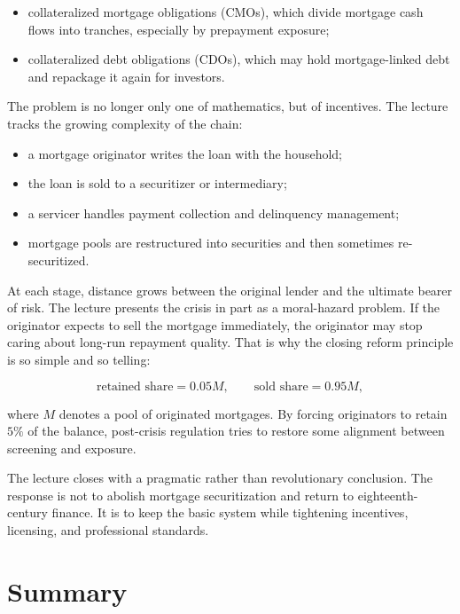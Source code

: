\begin{itemize}
\item collateralized mortgage obligations (CMOs), which divide mortgage cash flows into tranches, especially by prepayment exposure;
\item collateralized debt obligations (CDOs), which may hold mortgage-linked debt and repackage it again for investors.
\end{itemize}

The problem is no longer only one of mathematics, but of incentives. The lecture tracks the growing complexity of the chain:

\begin{itemize}
\item a mortgage originator writes the loan with the household;
\item the loan is sold to a securitizer or intermediary;
\item a servicer handles payment collection and delinquency management;
\item mortgage pools are restructured into securities and then sometimes re-securitized.
\end{itemize}

At each stage, distance grows between the original lender and the ultimate bearer of risk. The lecture presents the crisis in part as a moral-hazard problem. If the originator expects to sell the mortgage immediately, the originator may stop caring about long-run repayment quality. That is why the closing reform principle is so simple and so telling:

\begin{equation}
\text{retained share} = 0.05M,
\qquad
\text{sold share} = 0.95M,
\end{equation}

where \(M\) denotes a pool of originated mortgages. By forcing originators to retain \(5\%\) of the balance, post-crisis regulation tries to restore some alignment between screening and exposure.

The lecture closes with a pragmatic rather than revolutionary conclusion. The response is not to abolish mortgage securitization and return to eighteenth-century finance. It is to keep the basic system while tightening incentives, licensing, and professional standards.

\section{Summary}

